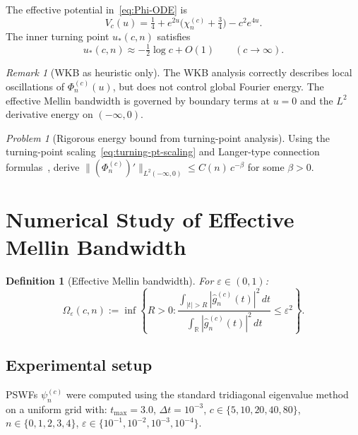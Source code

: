 \documentclass[12pt,a4paper]{amsart}
\newtheorem{definition}[theorem]{Definition}
\theoremstyle{remark}
\newtheorem{remark}[theorem]{Remark}
\newtheorem{problem}[theorem]{Problem}
\begin{document}
The effective potential in~\eqref{eq:Phi-ODE} is
\begin{equation}
\label{eq:potential}
V_c(u) = \tfrac{1}{4} + e^{2u}\bigl(\chi_n^{(c)} + \tfrac{3}{4}\bigr) - c^2 e^{4u}.
\end{equation}
The inner turning point $u_*(c,n)$ satisfies
\begin{equation}
\label{eq:turning-pt-scaling}
u_*(c,n) \approx -\tfrac{1}{2}\log c + O(1)
\qquad (c \to \infty).
\end{equation}

\begin{remark}[WKB as heuristic only]
\label{rem:wkb-synthesis}
The WKB analysis correctly describes local oscillations of
$\Phi_n^{(c)}(u)$, but does not control global Fourier energy.
The effective Mellin bandwidth is governed by boundary terms at
$u = 0$ and the $L^2$ derivative energy on $(-\infty,0)$.
\end{remark}

\begin{problem}[Rigorous energy bound from turning-point analysis]
\label{prob:energy-bound}
Using the turning-point scaling~\eqref{eq:turning-pt-scaling}
and Langer-type connection formulas~\cite{Olver1974}, derive
$\|(\Phi_n^{(c)})'\|_{L^2(-\infty,0)} \le C(n)\,c^{-\beta}$
for some $\beta > 0$.
\end{problem}

\section{Numerical Study of Effective Mellin Bandwidth}
\label{sec:numerical}

\begin{definition}[Effective Mellin bandwidth]
\label{def:omega-eps}
For $\varepsilon \in (0,1)$:
\begin{equation}
\label{eq:omega-eps-def}
\Omega_\varepsilon(c,n)
:= \inf\!\left\{R > 0 :
\frac{\int_{|t|>R}|\widehat{g}_n^{(c)}(t)|^2\,dt}
{\int_{\mathbb{R}}|\widehat{g}_n^{(c)}(t)|^2\,dt}
\le \varepsilon^2
\right\}.
\end{equation}
\end{definition}

\subsection{Experimental setup}

PSWFs $\psi_n^{(c)}$ were computed using the standard tridiagonal
eigenvalue method on a uniform grid with:
$t_{\max} = 3.0$, $\Delta t = 10^{-3}$,
$c \in \{5, 10, 20, 40, 80\}$,
$n \in \{0, 1, 2, 3, 4\}$,
$\varepsilon \in \{10^{-1}, 10^{-2}, 10^{-3}, 10^{-4}\}$.
\end{document}
